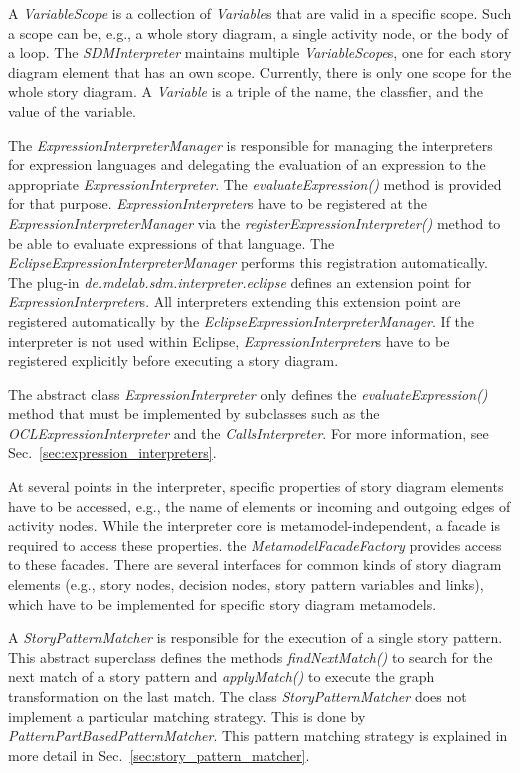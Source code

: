 
A \emph{VariableScope} is a collection of \emph{Variable}s that are valid in a specific scope. Such a scope can be, e.g., a whole story diagram, a single activity node, or the body of a loop. The \emph{SDMInterpreter} maintains multiple \emph{VariableScope}s, one for each story diagram element that has an own scope. Currently, there is only one scope for the whole story diagram. A \emph{Variable} is a triple of the name, the classfier, and the value of the variable.

The \emph{ExpressionInterpreterManager} is responsible for managing the interpreters for expression languages and delegating the evaluation of an expression to the appropriate \emph{ExpressionInterpreter}. The \emph{evaluateExpression()} method is provided for that purpose. \emph{ExpressionInterpreter}s have to be registered at the \emph{ExpressionInterpreterManager} via the \emph{registerExpressionInterpreter()} method to be able to evaluate expressions of that language. The \emph{EclipseExpressionInterpreterManager} performs this registration automatically. The plug-in \emph{de.mdelab.sdm.interpreter.eclipse} defines an extension point for \emph{ExpressionInterpreter}s. All interpreters extending this extension point are registered automatically by the \emph{EclipseExpressionInterpreterManager}. If the interpreter is not used within Eclipse, \emph{ExpressionInterpreter}s have to be registered explicitly before executing a story diagram.

The abstract class \emph{ExpressionInterpreter} only defines the \emph{evaluateExpression()} method that must be implemented by subclasses such as the \emph{OCLExpressionInterpreter} and the \emph{CallsInterpreter}. For more information, see Sec.~\ref{sec:expression_interpreters}.

At several points in the interpreter, specific properties of story diagram elements have to be accessed, e.g., the name of elements or incoming and outgoing edges of activity nodes. While the interpreter core is metamodel-independent, a facade is required to access these properties. the \emph{MetamodelFacadeFactory} provides access to these facades. There are several interfaces for common kinds of story diagram elements (e.g., story nodes, decision nodes, story pattern variables and links), which have to be implemented for specific story diagram metamodels.

A \emph{StoryPatternMatcher} is responsible for the execution of a single story pattern. This abstract superclass defines the methods \emph{findNextMatch()} to search for the next match of a story pattern and \emph{applyMatch()} to execute the graph transformation on the last match. The class \emph{StoryPatternMatcher} does not implement a particular matching strategy. This is done by \emph{PatternPartBasedPatternMatcher}. This pattern matching strategy is explained in more detail in Sec.~\ref{sec:story_pattern_matcher}. 



